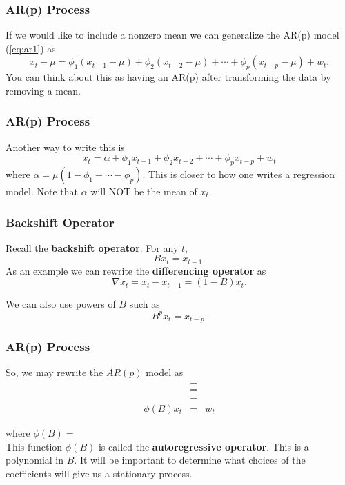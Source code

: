 \documentclass[%
xcolor=pdftex]{beamer}
\begin{document}
\begin{frame}
\frametitle{AR(p) Process}

If we would like to include a nonzero mean we can generalize the AR(p) model (\ref{eq:ar1}) as
$$
x_t-\mu =\phi_1 (x_{t-1}-\mu)+ \phi_2 (x_{t-2}-\mu)+ \cdots +  \phi_p (x_{t-p}-\mu) + w_t.
$$
You can think about this as having an AR(p) after transforming the data by removing a mean.

\end{frame}

\begin{frame}
\frametitle{AR(p) Process}

Another way to write this is
$$
x_t=\alpha+\phi_1 x_{t-1} + \phi_2 x_{t-2} + \cdots +  \phi_p x_{t-p} + w_t
$$
where $\alpha=\mu(1-\phi_1- \cdots -\phi_p)$.  This is closer to how one writes a regression model.  Note that $\alpha$ will NOT be the mean of $x_t$.

\end{frame}


\begin{frame}
\frametitle{Backshift Operator}

Recall the \textbf{backshift operator}.  For any $t$,
$$
B x_t =x_{t-1}.
$$
As an example we can rewrite the \textbf{differencing operator} as
$$
\nabla x_t =x_t-x_{t-1}=(1-B)x_{t}.
$$

We can also use powers of $B$ such as
$$
B^p x_t = x_{t-p}.
$$

\end{frame}

\begin{frame}
\frametitle{AR(p) Process}

So, we may rewrite the $AR(p)$ model as
\begin{eqnarray} \label{eq:ar_op}
 & =&  \nonumber \\
 & =&  \nonumber \\
 & =&     \nonumber \\
\phi(B) x_t & =&    w_t
\end{eqnarray}

where $\phi(B)=$ \\
\vspace{5mm}
This function $\phi(B)$ is called the \textbf{autoregressive operator}.  This is a polynomial in $B$.  It will be important to determine what choices of the coefficients will give us a stationary process.

\end{frame}
\end{document}
